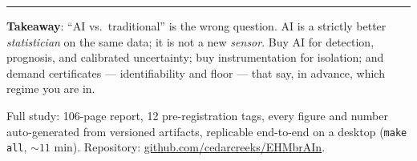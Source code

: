 \documentclass[11pt,twocolumn]{article}
\begin{document}
\vspace{1mm}
\noindent\rule{\linewidth}{0.4pt}
{\footnotesize \textbf{Takeaway}: ``AI vs.\ traditional'' is the wrong question. AI is a
strictly better \emph{statistician} on the same data; it is not a new \emph{sensor}. Buy AI
for detection, prognosis, and calibrated uncertainty; buy instrumentation for isolation;
and demand certificates --- identifiability and floor --- that say, in advance, which
regime you are in.\par
\vspace{0.8mm}
Full study: 106-page report, 12 pre-registration tags, every figure and number
auto-generated from versioned artifacts, replicable end-to-end on a desktop
(\texttt{make all}, ${\sim}11$ min). Repository:
\href{https://github.com/cedarcreeks/EHMbrAIn}{github.com/cedarcreeks/EHMbrAIn}.\par}
\end{document}
